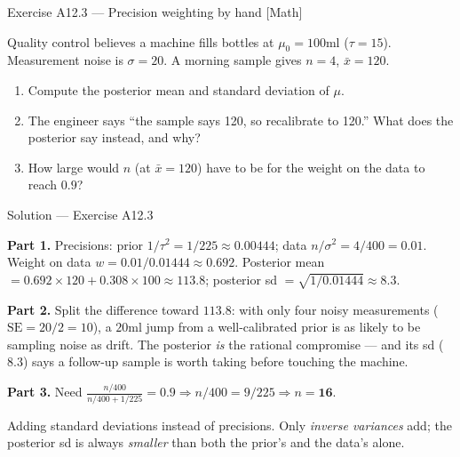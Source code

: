 \documentclass[aspectratio=169,11pt]{beamer}
\begin{document}
\begin{frame}{Exercise A12.3 --- Precision weighting by hand [Math]}
  \begin{exercise}
    Quality control believes a machine fills bottles at $\mu_0 = 100$ml
    ($\tau = 15$). Measurement noise is $\sigma = 20$. A morning sample gives
    $n = 4$, $\bar x = 120$.
    \begin{enumerate}
      \item Compute the posterior mean and standard deviation of $\mu$.
      \item The engineer says ``the sample says 120, so recalibrate to 120.''
            What does the posterior say instead, and why?
      \item How large would $n$ (at $\bar x = 120$) have to be for the weight on
            the data to reach $0.9$?
    \end{enumerate}
  \end{exercise}
\end{frame}

\begin{frame}{Solution --- Exercise A12.3}
  \begin{solutionbox}
    \footnotesize
    \textbf{Part 1.} Precisions: prior $1/\tau^2 = 1/225 \approx 0.00444$;
    data $n/\sigma^2 = 4/400 = 0.01$. Weight on data
    $w = 0.01 / 0.01444 \approx 0.692$. Posterior mean
    $= 0.692 \times 120 + 0.308 \times 100 \approx \mathbf{113.8}$;
    posterior sd $= \sqrt{1/0.01444} \approx \mathbf{8.3}$.
    \par\smallskip
    \textbf{Part 2.} Split the difference toward $113.8$: with only four noisy
    measurements ($\text{SE} = 20/2 = 10$), a $20$ml jump from a well-calibrated
    prior is as likely to be sampling noise as drift. The posterior \emph{is} the
    rational compromise --- and its sd ($8.3$) says a follow-up sample is worth
    taking before touching the machine.
    \par\smallskip
    \textbf{Part 3.} Need $\frac{n/400}{n/400 + 1/225} = 0.9
    \Rightarrow n/400 = 9/225 \Rightarrow n = \mathbf{16}$.
  \end{solutionbox}
  \begin{mistake}
    Adding standard deviations instead of precisions. Only \emph{inverse
    variances} add; the posterior sd is always \emph{smaller} than both the
    prior's and the data's alone.
  \end{mistake}
\end{frame}

\end{document}
